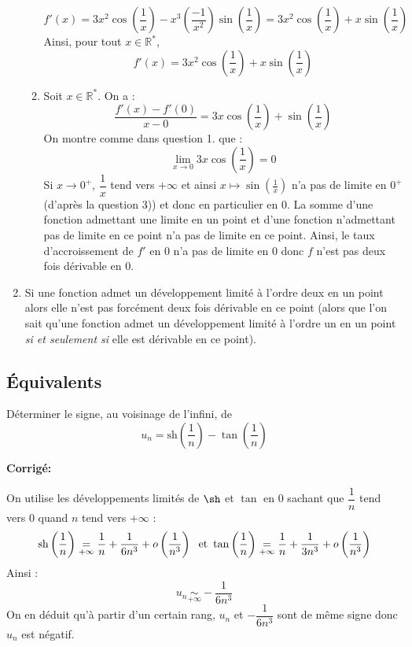 \documentclass[a4paper,twoside,french,10pt]{VcCours}
\newcommand{\corr}{\textbf{Corrigé:}}
\begin{document}
\begin{enumerate}
\begin{enumerate}
$$ f'(x) = 3x^2 \cos \left( \frac{1}{x} \right) - x^3 \left( \frac{-1}{x^2} \right)  \sin \left( \frac{1}{x} \right) = 3x^2 \cos \left( \frac{1}{x} \right) + x  \sin \left( \frac{1}{x} \right)$$
Ainsi, pour tout $x \in \mathbb{R}^*$, 
$$f'(x) = 3x^2 \cos \left( \frac{1}{x} \right) + x  \sin \left( \frac{1}{x} \right)$$
\item Soit $x \in \mathbb{R}^*$. On a :
$$ \frac{f'(x)-f'(0)}{x-0} = 3x \cos \left( \frac{1}{x} \right) +   \sin \left( \frac{1}{x} \right)$$
On montre comme dans question 1. que :
$$ \lim_{x \rightarrow 0} 3x \cos \left( \frac{1}{x} \right) = 0$$
Si $x \rightarrow 0^+$, $\dfrac{1}{x}$ tend vers $+ \infty$ et ainsi $x \mapsto \sin \left( \frac{1}{x} \right)$ n'a pas de limite en $0^+$ (d'après la question 3)) et donc en particulier en $0$. La somme d'une fonction admettant une limite en un point et d'une fonction n'admettant pas de limite en ce point n'a pas de limite en ce point. Ainsi, le taux d'accroissement de $f'$ en $0$ n'a pas de limite en $0$ donc $f$ n'est pas deux fois dérivable en $0$.
\end{enumerate}
\item Si une fonction admet un développement limité à l'ordre deux en un point alors elle n'est pas forcément deux fois dérivable en ce point (alors que l'on sait qu'une fonction admet un développement limité à l'ordre un en un point \textit{si et seulement si} elle est dérivable en ce point).
\end{enumerate}

\medskip



\medskip

\subsection{Équivalents}

\medskip


\begin{Exercice}{} D\'{e}terminer le signe, au voisinage de l'infini, de 
$$u_{n}=\text{sh}\left( \dfrac{1}{n}\right) -\tan \left( \dfrac{1}{n}\right)$$
\end{Exercice}

\corr

On utilise les développements limités de $\sh$ et $\tan$ en $0$ sachant que $\dfrac{1}{n}$ tend vers $0$ quand $n$ tend vers $+ \infty$ : 
$$\textrm{sh} \left(\dfrac{1}{n} \right) \underset{+ \infty}{=} \dfrac{1}{n} + \dfrac{1}{{6n^3 }} + o\left( {\dfrac{1}{{n^3 }}} \right) \; \hbox{ et } \tan \left(\dfrac{1}{n}\right) \underset{+ \infty}{=} \dfrac{1}{n} + \dfrac{1}{{3n^3 }} + o\left( {\dfrac{1}{{n^3 }}} \right)$$
Ainsi :
$$u_n  \underset{+ \infty}{\sim } - \dfrac{1}{{6n^3 }}$$
On en déduit qu'à partir d'un certain rang, $u_n$ et $ - \dfrac{1}{{6n^3 }}$ sont de même signe donc $u_n$ est négatif.
\end{document}
